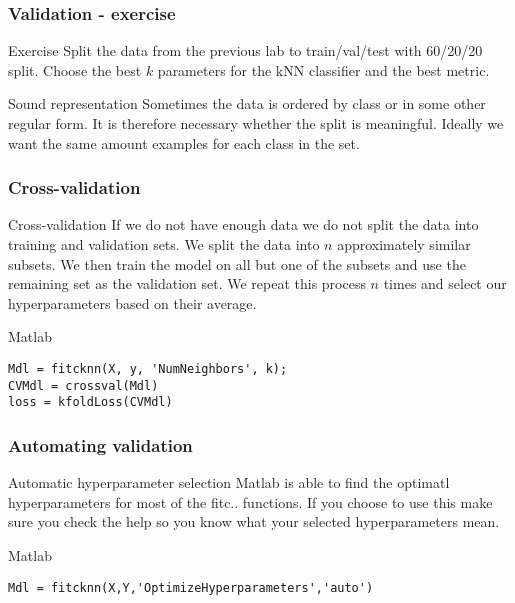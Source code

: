 \documentclass{beamer}
\begin{document}
\begin{frame}
\frametitle{Validation - exercise}
\begin{block}{Exercise}
Split the data from the previous lab to train/val/test with 60/20/20 split. Choose the best $k$ parameters for the kNN classifier and the best metric.
\end{block}

\begin{block}{Sound representation}
Sometimes the data is ordered by class or in some other regular form. It is therefore necessary whether the split is meaningful. Ideally we want the same amount examples for each class in the set.
\end{block}
\end{frame}

\begin{frame}[fragile]
\frametitle{Cross-validation}
\begin{block}{Cross-validation}
If we do not have enough data we do not split the data into training and validation sets. We split the data into $n$ approximately similar subsets. We then train the model on all but one of the subsets and use the remaining set as the validation set. We repeat this process $n$ times and select our hyperparameters based on their average.
\end{block}

\begin{block}{Matlab}
\begin{verbatim}
Mdl = fitcknn(X, y, 'NumNeighbors', k);
CVMdl = crossval(Mdl)
loss = kfoldLoss(CVMdl) \end{verbatim}
\end{block}
\end{frame}



\begin{frame}[fragile]
\frametitle{Automating validation}
\begin{block}{Automatic hyperparameter selection}
Matlab is able to find the optimatl hyperparameters for most of the fitc.. functions. If you choose to use this make sure you check the help so you know what your selected hyperparameters mean.
\end{block}

\begin{block}{Matlab}
\begin{verbatim}
Mdl = fitcknn(X,Y,'OptimizeHyperparameters','auto')\end{verbatim}
\end{block}
\end{frame}
\end{document}
